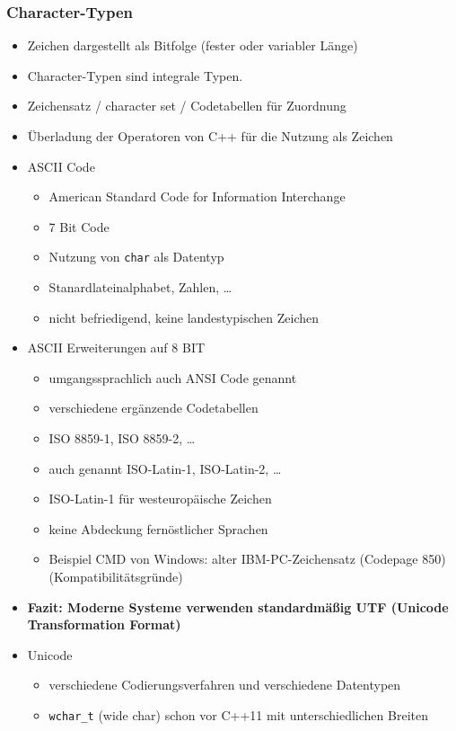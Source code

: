 \documentclass[a4paper]{report}
\begin{document}

\subsubsection{Character-Typen}
\begin{itemize}
	\item Zeichen dargestellt als Bitfolge (fester oder variabler Länge)
	\item Character-Typen sind integrale Typen.
	\item Zeichensatz / character set / Codetabellen für Zuordnung
	\item Überladung der Operatoren von C++ für die Nutzung als Zeichen
	\bigskip
	\item ASCII Code
	\begin{itemize}
		\item American Standard Code for Information Interchange
		\item 7 Bit Code
		\item Nutzung von \texttt{char} als Datentyp
		\item Stanardlateinalphabet, Zahlen, \dots
		\item nicht befriedigend, keine landestypischen Zeichen
		\bigskip
	\end{itemize}
	\item ASCII Erweiterungen auf 8 BIT
	\begin{itemize}
			\item umgangssprachlich auch ANSI Code genannt
			\item verschiedene ergänzende Codetabellen
			\item ISO 8859-1, ISO 8859-2, \dots
			\item auch genannt ISO-Latin-1, ISO-Latin-2, \dots
			\item ISO-Latin-1 für westeuropäische Zeichen
			\item keine Abdeckung fernöstlicher Sprachen
			\item Beispiel CMD von Windows: alter IBM-PC-Zeichensatz (Codepage 850) (Kompatibilitätsgründe)		
	\end{itemize}
	\bigskip
	\item \textbf{Fazit: Moderne Systeme verwenden standardmäßig UTF (Unicode Transformation Format)}
	\bigskip
	\item Unicode
	\begin{itemize}
		\item verschiedene Codierungsverfahren und verschiedene Datentypen
		\item \texttt{wchar\_t} (wide char) schon vor C++11 mit unterschiedlichen Breiten

\end{itemize}
\end{itemize}
\end{document}

